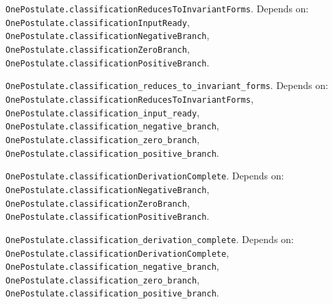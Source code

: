 \begin{definition}\label{OnePostulate.classificationReducesToInvariantForms}
\texttt{OnePostulate.classificationReducesToInvariantForms}. Depends on: \texttt{OnePostulate.classificationInputReady}, \texttt{OnePostulate.classificationNegativeBranch}, \texttt{OnePostulate.classificationZeroBranch}, \texttt{OnePostulate.classificationPositiveBranch}.
\end{definition}

\begin{lemma}\label{OnePostulate.classification_reduces_to_invariant_forms}
\texttt{OnePostulate.classification\_reduces\_to\_invariant\_forms}. Depends on: \texttt{OnePostulate.classificationReducesToInvariantForms}, \texttt{OnePostulate.classification\_input\_ready}, \texttt{OnePostulate.classification\_negative\_branch}, \texttt{OnePostulate.classification\_zero\_branch}, \texttt{OnePostulate.classification\_positive\_branch}.
\end{lemma}

\begin{definition}\label{OnePostulate.classificationDerivationComplete}
\texttt{OnePostulate.classificationDerivationComplete}. Depends on: \texttt{OnePostulate.classificationNegativeBranch}, \texttt{OnePostulate.classificationZeroBranch}, \texttt{OnePostulate.classificationPositiveBranch}.
\end{definition}

\begin{lemma}\label{OnePostulate.classification_derivation_complete}
\texttt{OnePostulate.classification\_derivation\_complete}. Depends on: \texttt{OnePostulate.classificationDerivationComplete}, \texttt{OnePostulate.classification\_negative\_branch}, \texttt{OnePostulate.classification\_zero\_branch}, \texttt{OnePostulate.classification\_positive\_branch}.
\end{lemma}
